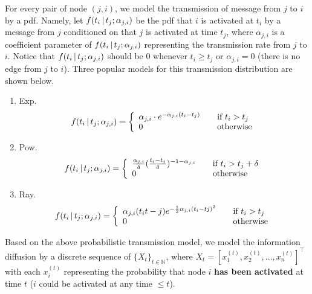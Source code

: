 \documentclass[11pt]{article}
\begin{document}
For every pair of node $(j,i)$, we model the transmission of message from $j$ to $i$ by a pdf. Namely, let $f(t_{i}\,|\, t_{j} ; \alpha_{j,i})$ be the pdf that $i$ is activated at $t_{i}$ by a message from $j$ conditioned on that $j$ is activated at time $t_{j}$, where $\alpha_{j,i}$ is a coefficient parameter of $f(t_{i}\,|\, t_{j} ; \alpha_{j,i})$ representing the transmission rate from $j$ to $i$. Notice that $f(t_{i}\,|\, t_{j} ; \alpha_{j,i})$ should be $0$ whenever $t_{i} \geq t_{j}$ or $\alpha_{j,i}=0$ (there is no edge from $j$ to $i$). Three popular models for this transmission distribution are shown below.
\begin{enumerate}
\item Exp. \[ f(t_{i}\,|\, t_{j} ; \alpha_{j,i}) = \left\{ 
  \begin{array}{l l}
    \alpha_{j,i}\cdot e^{-\alpha_{j,i} (t_{i}-t_{j})} & \quad \text{if $t_{i}>t_{j}$}\\
    0 & \quad \text{otherwise}
  \end{array} \right.\]
\item Pow. \[ f(t_{i}\,|\, t_{j} ; \alpha_{j,i}) = \left\{ 
  \begin{array}{l l}
   \frac{\alpha_{j,i}}{\delta} (\frac{t_{i}-t_{j}}{\delta})^{-1-\alpha_{j,i}} & \quad \text{if $t_{i}>t_{j}+\delta$}\\
    0 & \quad \text{otherwise}
  \end{array} \right.\]
\item Ray. \[ f(t_{i}\,|\, t_{j} ; \alpha_{j,i}) = \left\{ 
  \begin{array}{l l}
   \alpha_{j,i}(t_{i}t-{j})e^{-\frac{1}{2}\alpha_{j,i}(t_{i}-t{j})^{2}} & \quad \text{if $t_{i}>t_{j}$}\\
    0 & \quad \text{otherwise}
  \end{array} \right.\]
\end{enumerate} 
Based on the above probabilistic transmission model, we model the information diffusion by a discrete sequence of $\{X_{t}\}_{t \in {\mathbb{N}}}$, where $X_{t}=[x_{1}^{(t)}, x_{2}^{(t)} , \dots , x_{n}^{(t)}]^{\top}$ with each $x_{i}^{(t)}$ representing the probability that node $i$ {\bf has been activated} at time $t$ ($i$ could be activated at any time $\leq t$).
\end{document}
